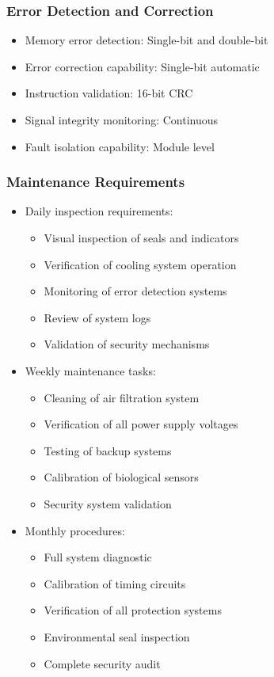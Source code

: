 \documentclass[12pt]{article}
\begin{document}
\subsubsection{Error Detection and Correction}
\begin{itemize}
    \item Memory error detection: Single-bit and double-bit
    \item Error correction capability: Single-bit automatic
    \item Instruction validation: 16-bit CRC
    \item Signal integrity monitoring: Continuous
    \item Fault isolation capability: Module level
\end{itemize}

\subsubsection{Maintenance Requirements}
\begin{itemize}
    \item Daily inspection requirements:
        \begin{itemize}
            \item Visual inspection of seals and indicators
            \item Verification of cooling system operation
            \item Monitoring of error detection systems
            \item Review of system logs
            \item Validation of security mechanisms
        \end{itemize}
    \item Weekly maintenance tasks:
        \begin{itemize}
            \item Cleaning of air filtration system
            \item Verification of all power supply voltages
            \item Testing of backup systems
            \item Calibration of biological sensors
            \item Security system validation
        \end{itemize}
    \item Monthly procedures:
        \begin{itemize}
            \item Full system diagnostic
            \item Calibration of timing circuits
            \item Verification of all protection systems
            \item Environmental seal inspection
            \item Complete security audit
        \end{itemize}
\end{itemize}
\end{document}
